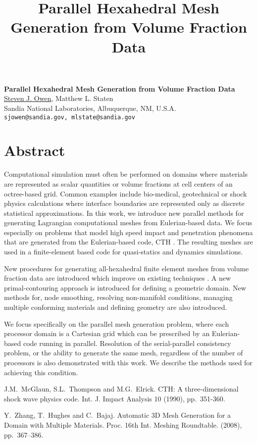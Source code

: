 \title{Parallel Hexahedral Mesh Generation from Volume Fraction Data}
\author{} \institute{}

\begin{center}

\textbf{\Large Parallel Hexahedral Mesh Generation from Volume Fraction Data}\\
\vspace{10mm}
{\large \underline{Steven J. Owen}, Matthew L. Staten}\\
Sandia National Laboratories, Albuquerque, NM, U.S.A.\\
{\tt sjowen@sandia.gov, mlstate@sandia.gov}\\

\end{center}

\section*{Abstract}

Computational simulation must often be performed on domains where materials are represented as scalar quantities or volume fractions at cell centers of an octree-based grid. Common examples include bio-medical, geotechnical or shock physics calculations where interface boundaries are represented only as discrete statistical approximations.  In this work, we introduce new parallel methods for generating Lagrangian computational meshes from Eulerian-based data. We focus especially on problems that model high speed impact and penetration phenomena that are generated from the Eulerian-based code, CTH \cite{CTH90}.  The resulting meshes are used in a finite-element based code for quasi-statics and dynamics simulations. 

New procedures for generating all-hexahedral finite element meshes from volume fraction data are introduced which improve on existing techniques \cite{Zhang08}. A new primal-contouring approach is introduced for defining a geometric domain. New methods for, node smoothing, resolving non-manifold conditions, managing multiple conforming materials and defining geometry are also introduced. 

We focus specifically on the parallel mesh generation problem, where each processor domain is a Cartesian grid which can be prescribed by an Eulerian-based code running in parallel.  Resolution of the serial-parallel consistency problem, or the ability to generate the same mesh, regardless of the number of processors is also demonstrated with this work. We describe the methods used for achieving this condition.



\begin{thebibliography}{10}

{\sc J.M.~McGlaun, S.L.~Thompson and M.G.~Elrick}. {CTH: A three-dimensional shock wave physics code}. Int. J. Impact Analysis 10 (1990), pp.~351-360.

{\sc Y.~Zhang, T.~Hughes and C.~Bajaj}. {Automatic 3D Mesh Generation for a Domain with Multiple Materials}. Proc. 16th Int. Meshing Roundtable. (2008), pp.~367--386.

\end{thebibliography}